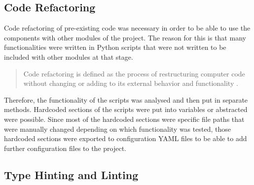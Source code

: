 \documentclass{article}
\begin{document}

    \subsection{Code Refactoring}
    \label{sec:code-refactoring-code-quality}

        Code refactoring of pre-existing code was necessary in order to be able to use the components with other modules of the project.
        The reason for this is that many functionalities were written in Python scripts that were not written to be included with other modules at that stage.
        \begin{quote}
            Code refactoring is defined as the process of restructuring computer code without changing or adding to its external behavior and functionality \cite{wattsWhatCodeRefactoring2018}.
        \end{quote}
        Therefore, the functionality of the scripts was analysed and then put in separate methods.
        Hardcoded sections of the scripts were put into variables or abstracted were possible. 
        Since most of the hardcoded sections were specific file paths that were manually changed depending on which functionality was tested, those hardcoded sections were exported to configuration YAML files to be able to add further configuration files to the project.


    \subsection{Type Hinting and Linting}
    \label{sec:type-hinting-code-quality}
\end{document}
